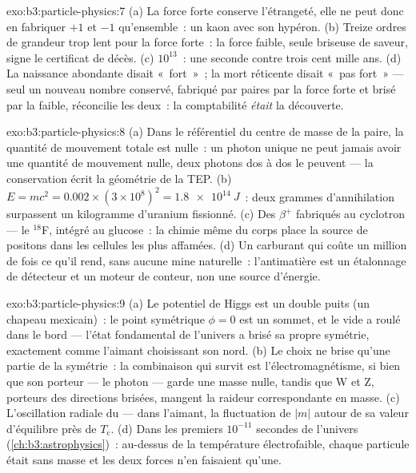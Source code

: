\begin{solution}{exo:b3:particle-physics:7}
(a) La force forte conserve l'étrangeté, elle ne peut donc en
fabriquer $+1$ et $-1$ qu'ensemble~: un kaon avec son hypéron. (b)
Treize ordres de grandeur trop lent pour la force forte~: la force
faible, seule briseuse de saveur, signe le certificat de décès.
(c) $10^{13}$~: une seconde contre trois cent mille ans.
(d) La naissance abondante disait «~fort~»~; la mort réticente
disait «~pas fort~» --- seul un nouveau nombre conservé, fabriqué
par paires par la force forte et brisé par la faible, réconcilie les
deux~: la comptabilité \emph{était} la découverte.
\end{solution}

\begin{solution}{exo:b3:particle-physics:8}
(a) Dans le référentiel du centre de masse de la paire, la quantité
de mouvement totale est nulle~: un photon unique ne peut jamais
avoir une quantité de mouvement nulle, deux photons dos à dos le
peuvent --- la conservation écrit la géométrie de la TEP. (b) $E = mc^2 =
0.002\times(3\times10^8)^2 = \qty{1.8e14}{J}$~: deux grammes
d'annihilation surpassent un kilogramme d'uranium fissionné. (c) Des
 $\beta^+$ fabriqués au cyclotron --- le $^{18}$F, intégré
au glucose~: la chimie même du corps place la source de positons
dans les cellules les plus affamées. (d) Un carburant qui coûte un
million de fois ce qu'il rend, sans aucune mine naturelle~:
l'antimatière est un étalonnage de détecteur et un moteur de
conteur, non une source d'énergie.
\end{solution}

\begin{solution}{exo:b3:particle-physics:9}
(a) Le potentiel de Higgs est un double puits (un chapeau
mexicain)~: le point symétrique $\phi = 0$ est un sommet, et le vide
a roulé dans le bord --- l'état fondamental de l'univers a brisé sa
propre symétrie, exactement comme l'aimant choisissant son nord. (b)
Le choix ne brise qu'une partie de la symétrie~: la combinaison qui
survit est l'électromagnétisme, si bien que son porteur --- le
photon --- garde une masse nulle, tandis que W et Z, porteurs des
directions brisées, mangent la raideur correspondante en masse. (c)
L'oscillation radiale du  --- dans l'aimant, la
fluctuation de $|m|$ autour de sa valeur d'équilibre près de
$T_{\text{c}}$. (d) Dans les premiers $10^{-11}$ secondes de
l'univers (\cref{ch:b3:astrophysics})~: au-dessus de la température
électrofaible, chaque particule était sans masse et les deux forces
n'en faisaient qu'une.
\end{solution}

